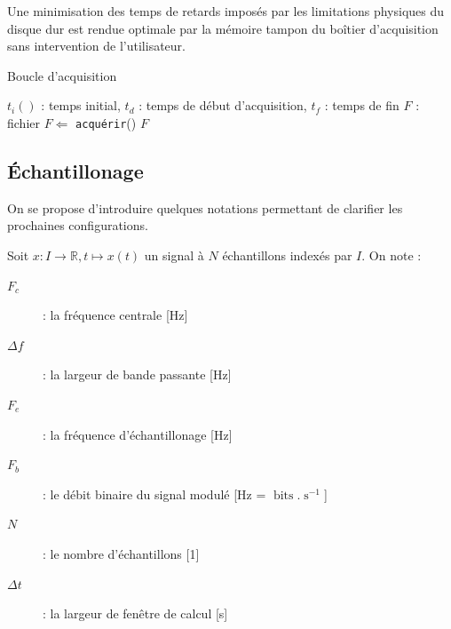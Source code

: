 \documentclass[twocolumn,pre,floats,aps,amsmath,amssymb]{revtex4}
\newenvironment{notation}[1][Notation.]{\begin{trivlist}
\item[\hskip \labelsep {\bfseries #1}]}{\end{trivlist}}
\newenvironment{remark}[1][Remarque.]{\begin{trivlist}
\item[\hskip \labelsep {\bfseries #1}]}{\end{trivlist}}
\begin{document}

\begin{remark}
  Une minimisation des temps de retards impos\'es par les limitations physiques du disque dur est rendue optimale par la m\'emoire tampon du bo\^itier d'acquisition\cite{NI_6353_datasheet} sans intervention de l'utilisateur.
\end{remark}

\begin{algorithm}[h]
\caption{Boucle d'acquisition}
\label{algo_boucle_acquisition}
\begin{algorithmic}[1]
  \REQUIRE $t_i()$ : temps initial, $t_d$ : temps de d\'ebut d'acquisition, $t_f$ : temps de fin
  \STATE $F$ : fichier
  \STATE $F \Leftarrow$ \texttt{acqu\'erir}()
  \ENDWHILE
  \RETURN $F$
\end{algorithmic}
\end{algorithm}

\subsection{\'Echantillonage}
On se propose d'introduire quelques notations permettant de clarifier les prochaines configurations.

\begin{notation}
Soit $x : I \rightarrow \mathbb{R}, t \mapsto x(t)$ un signal \`a $N$ \'echantillons index\'es par $I$. On note :
\begin{description}
\item[$F_c$]{ : la fr\'equence centrale [Hz]}
\item[$\Delta f$]{ : la largeur de bande passante [Hz]}
\item[$F_e$]{ : la fr\'equence d'\'echantillonage [Hz]}
\item[$F_b$]{ : le d\'ebit binaire du signal modul\'e [Hz = $\operatorname{bits}.\operatorname{s}^{-1}$]}
\item[$N$]{ : le nombre d'\'echantillons [1]}
\item[$\Delta t$]{ : la largeur de fen\^etre de calcul [s]}
\end{description}
\end{notation}

\end{document}
